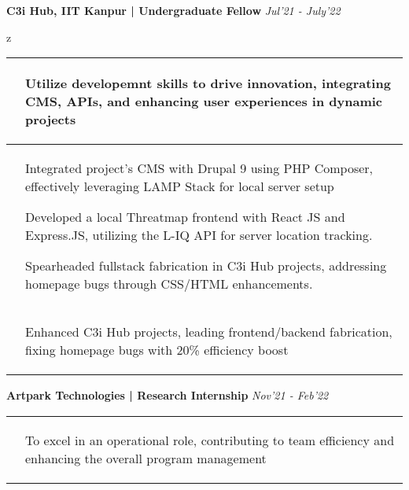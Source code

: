 \documentclass[10pt]{extarticle}
\begin{document}
{\begin{flushleft}
\begin{tcolorbox}[center, width=20.7cm, colback=black!10]
\textbf{C3i Hub, IIT Kanpur | Undergraduate Fellow}  \hfill\hfill\textcolor{black!80}{\small \textit{Jul'21 - July'22}}
\end{tcolorbox}z
\vspace{-10pt}
\begin{center}
\begin{tabularx}{\textwidth}{ p{1.7cm} | X }
\centering\multirow{1}{*}{\textbf{Objective}} & 
\begin{tabitemize}
    \item Utilize developemnt skills to drive innovation, integrating CMS, APIs, and enhancing user experiences in dynamic projects
    
\end{tabitemize}\\
\hline
\centering\multirow{1}{*}{\textbf{Approach}} & 
\begin{tabitemize}
    \item Integrated project's CMS with Drupal 9 using PHP Composer, effectively leveraging LAMP Stack for local server setup
    \item Developed a local Threatmap frontend with React JS and Express.JS, utilizing the L-IQ API for server location tracking.
    \item Spearheaded fullstack fabrication in C3i Hub projects, addressing homepage bugs through CSS/HTML enhancements.
\end{tabitemize}\\

\hline
\centering\multirow{1}{*}{\textbf{Impact}}& 
\begin{tabitemize}
\item Enhanced C3i Hub projects, leading frontend/backend fabrication, fixing homepage bugs with 20\% efficiency boost
\end{tabitemize}\\
\end{tabularx}
\end{center}

\begin{tcolorbox}[center, width=20.7cm, colback=black!10]
\textbf{Artpark Technologies | Research Internship}  \hfill\hfill\textcolor{black!80}{\small \textit{Nov'21 - Feb'22}}
\end{tcolorbox}
\vspace{-10pt}
\begin{center}
\begin{tabularx}{\textwidth}{ p{1.7cm} | X }
\centering\multirow{1}{*}{\textbf{Objective}} & 
\begin{tabitemize}
    \item To excel in an operational role, contributing to team efficiency and enhancing the overall program management
   

\end{tabitemize}
\end{tabularx}
\end{center}
\end{flushleft}}
\end{document}
